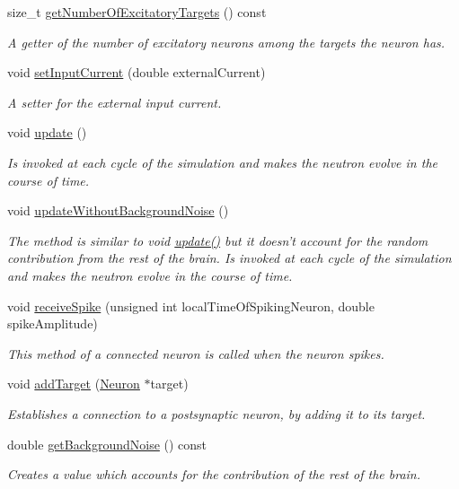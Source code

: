 \begin{DoxyCompactItemize}
size\-\_\-t \hyperlink{classNeuron_a3c6a80c21ff5172e4de00c7dbf706303}{get\-Number\-Of\-Excitatory\-Targets} () const 
\begin{DoxyCompactList}\small\item\em A getter of the number of excitatory neurons among the targets the neuron has. \end{DoxyCompactList}\item 
void \hyperlink{classNeuron_ae77210c7b0bf3739b01ec2e3dba96827}{set\-Input\-Current} (double external\-Current)
\begin{DoxyCompactList}\small\item\em A setter for the external input current. \end{DoxyCompactList}\item 
void \hyperlink{classNeuron_a782b3b728eee5097ab205a7a7990225b}{update} ()
\begin{DoxyCompactList}\small\item\em Is invoked at each cycle of the simulation and makes the neutron evolve in the course of time. \end{DoxyCompactList}\item 
void \hyperlink{classNeuron_ababbaa5bc5f7b2e00e0ae5ffcc8fbfdb}{update\-Without\-Background\-Noise} ()
\begin{DoxyCompactList}\small\item\em The method is similar to void \hyperlink{classNeuron_a782b3b728eee5097ab205a7a7990225b}{update()} but it doesn't account for the random contribution from the rest of the brain. Is invoked at each cycle of the simulation and makes the neutron evolve in the course of time. \end{DoxyCompactList}\item 
void \hyperlink{classNeuron_aa8111a347de6ddfb6c799bdcd3092cb7}{receive\-Spike} (unsigned int local\-Time\-Of\-Spiking\-Neuron, double spike\-Amplitude)
\begin{DoxyCompactList}\small\item\em This method of a connected neuron is called when the neuron spikes. \end{DoxyCompactList}\item 
void \hyperlink{classNeuron_a9bf071c800e76fa7fbd611cee7cd76d6}{add\-Target} (\hyperlink{classNeuron}{Neuron} $\ast$target)
\begin{DoxyCompactList}\small\item\em Establishes a connection to a postsynaptic neuron, by adding it to its target. \end{DoxyCompactList}\item 
double \hyperlink{classNeuron_a5487631e8982ae2368da0917535a9001}{get\-Background\-Noise} () const 
\begin{DoxyCompactList}\small\item\em Creates a value which accounts for the contribution of the rest of the brain. \end{DoxyCompactList}\end{DoxyCompactItemize}
